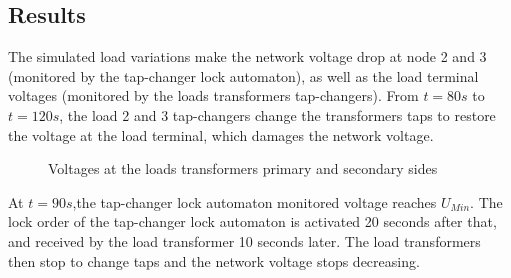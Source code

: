 \documentclass[a4paper, 12pt]{report}
\begin{document}
\subsection{Results}

The simulated load variations make the network voltage drop at node 2 and 3 (monitored by the tap-changer lock automaton), as well as the load terminal voltages (monitored by the loads transformers tap-changers). From $t=80s$ to $t=120s$, the load 2 and 3 tap-changers change the transformers taps to restore the voltage at the load terminal, which damages the network voltage.

\begin{figure}[H]
\caption{Voltages at the loads transformers primary and secondary sides}
\end{figure}

At $t=90s$,the tap-changer lock automaton monitored voltage reaches $U_{Min}$. The lock order of the tap-changer lock automaton is activated 20 seconds after that, and received by the load transformer 10 seconds later. The load transformers then stop to change taps and the network voltage stops decreasing.
\end{document}
